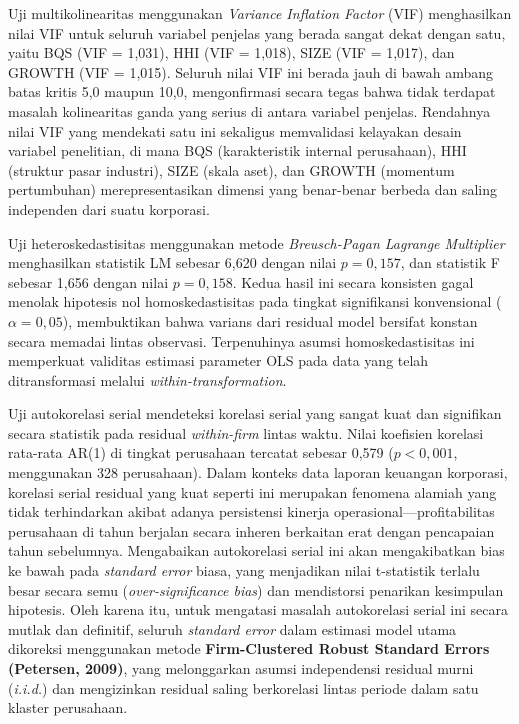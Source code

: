\documentclass[12pt,a4paper]{article}
\begin{document}
Uji multikolinearitas menggunakan \emph{Variance Inflation Factor} (VIF)
menghasilkan nilai VIF untuk seluruh variabel penjelas yang berada
sangat dekat dengan satu, yaitu BQS (VIF = 1,031), HHI (VIF = 1,018),
SIZE (VIF = 1,017), dan GROWTH (VIF = 1,015). Seluruh nilai VIF ini
berada jauh di bawah ambang batas kritis 5,0 maupun 10,0, mengonfirmasi
secara tegas bahwa tidak terdapat masalah kolinearitas ganda yang serius
di antara variabel penjelas. Rendahnya nilai VIF yang mendekati satu ini
sekaligus memvalidasi kelayakan desain variabel penelitian, di mana BQS
(karakteristik internal perusahaan), HHI (struktur pasar industri), SIZE
(skala aset), dan GROWTH (momentum pertumbuhan) merepresentasikan
dimensi yang benar-benar berbeda dan saling independen dari suatu
korporasi.

Uji heteroskedastisitas menggunakan metode \emph{Breusch-Pagan Lagrange
Multiplier} menghasilkan statistik LM sebesar 6,620 dengan nilai
\(p = 0{,}157\), dan statistik F sebesar 1,656 dengan nilai
\(p = 0{,}158\). Kedua hasil ini secara konsisten gagal menolak
hipotesis nol homoskedastisitas pada tingkat signifikansi konvensional
(\(\alpha = 0{,}05\)), membuktikan bahwa varians dari residual model
bersifat konstan secara memadai lintas observasi. Terpenuhinya asumsi
homoskedastisitas ini memperkuat validitas estimasi parameter OLS pada
data yang telah ditransformasi melalui \emph{within-transformation}.

Uji autokorelasi serial mendeteksi korelasi serial yang sangat kuat dan
signifikan secara statistik pada residual \emph{within-firm} lintas
waktu. Nilai koefisien korelasi rata-rata AR(1) di tingkat perusahaan
tercatat sebesar 0,579 (\(p < 0{,}001\), menggunakan 328 perusahaan).
Dalam konteks data laporan keuangan korporasi, korelasi serial residual
yang kuat seperti ini merupakan fenomena alamiah yang tidak terhindarkan
akibat adanya persistensi kinerja operasional---profitabilitas
perusahaan di tahun berjalan secara inheren berkaitan erat dengan
pencapaian tahun sebelumnya. Mengabaikan autokorelasi serial ini akan
mengakibatkan bias ke bawah pada \emph{standard error} biasa, yang
menjadikan nilai t-statistik terlalu besar secara semu
(\emph{over-significance bias}) dan mendistorsi penarikan kesimpulan
hipotesis. Oleh karena itu, untuk mengatasi masalah autokorelasi serial
ini secara mutlak dan definitif, seluruh \emph{standard error} dalam
estimasi model utama dikoreksi menggunakan metode \textbf{Firm-Clustered
Robust Standard Errors (Petersen, 2009)}, yang melonggarkan asumsi
independensi residual murni (\emph{i.i.d.}) dan mengizinkan residual
saling berkorelasi lintas periode dalam satu klaster perusahaan.
\end{document}
